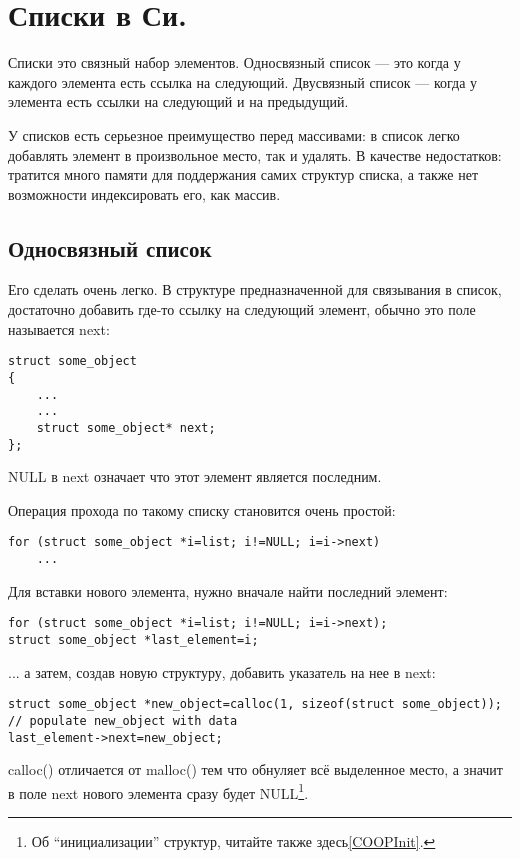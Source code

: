 \section{Списки в Си.}

Списки это связный набор элементов. Односвязный список --- это когда у каждого элемента есть ссылка на следующий.
Двусвязный список --- когда у элемента есть ссылки на следующий и на предыдущий.

У списков есть серьезное преимущество перед массивами: в список легко добавлять элемент в произвольное место,
так и удалять. В качестве недостатков: тратится много памяти для поддержания самих структур списка, а также
нет возможности индексировать его, как массив.

\subsection{Односвязный список}

Его сделать очень легко. В структуре предназначенной для связывания в список, достаточно добавить где-то
ссылку на следующий элемент, обычно это поле называется next:

\begin{lstlisting}
struct some_object
{
	...
	...
	struct some_object* next;
};
\end{lstlisting}

NULL в next означает что этот элемент является последним.

Операция прохода по такому списку становится очень простой:

\begin{lstlisting}
for (struct some_object *i=list; i!=NULL; i=i->next)
	...
\end{lstlisting}

Для вставки нового элемента, нужно вначале найти последний элемент:

\begin{lstlisting}
for (struct some_object *i=list; i!=NULL; i=i->next);
struct some_object *last_element=i;
\end{lstlisting}

... а затем, создав новую структуру, добавить указатель на нее в next:

\begin{lstlisting}
struct some_object *new_object=calloc(1, sizeof(struct some_object));
// populate new_object with data
last_element->next=new_object;
\end{lstlisting}

calloc() отличается от malloc() тем что обнуляет всё выделенное место, а значит в поле next нового
элемента сразу будет NULL\footnote{Об ``инициализации'' структур, читайте также здесь\ref{COOPInit}.}.

